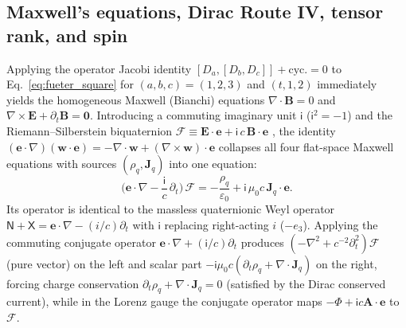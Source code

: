 \documentclass[aps,prd,onecolumn,tightenlines,nofootinbib,notitlepage,10pt,floatfix]{revtex4-2}
\theoremstyle{indentedtheorem}
\begin{document}
\subsection{Maxwell's equations, Dirac Route IV, tensor rank, and spin}
\label{sec:maxwell}

Applying the operator Jacobi identity $[D_a,[D_b,D_c]]+\text{cyc.}=0$ to Eq.~\eqref{eq:fueter_square} for $(a,b,c)=(1,2,3)$ and $(t,1,2)$ immediately yields the homogeneous Maxwell (Bianchi) equations $\nabla\cdot\mathbf{B}=0$ and $\nabla\times\mathbf{E}+\partial_t\mathbf{B}=\mathbf{0}$. Introducing a commuting imaginary unit $\mathsf{i}$ ($\mathsf{i}^2=-1$) and the Riemann--Silberstein biquaternion $\mathcal{F}\equiv\mathbf{E}\cdot\mathbf{e}+\mathsf{i}\,c\,\mathbf{B}\cdot\mathbf{e}$ \citep{Silberstein1907Elektromagnetische,Silberstein1912Quaternionic,BialynickiBirula1996Photon}, the identity $(\mathbf{e}\cdot\nabla)(\mathbf{w}\cdot\mathbf{e})=-\nabla\cdot\mathbf{w}+(\nabla\times\mathbf{w})\cdot\mathbf{e}$ collapses all four flat-space Maxwell equations with sources $(\rho_q,\mathbf{J}_q)$ into one equation:
\begin{equation}
    \Big(\mathbf{e}\cdot\nabla-\frac{\mathsf{i}}{c}\,\partial_t\Big)\,\mathcal{F} = -\frac{\rho_q}{\varepsilon_0} + \mathsf{i}\,\mu_0 c\,\mathbf{J}_q\cdot\mathbf{e} .
    \label{eq:maxwell_biquaternion}
\end{equation}
Its operator is identical to the massless quaternionic Weyl operator $\mathsf{N}+\mathsf{X}=\mathbf{e}\cdot\nabla-(i/c)\partial_t$ with $\mathsf{i}$ replacing right-acting $i$ ($-e_3$). Applying the commuting conjugate operator $\mathbf{e}\cdot\nabla+(\mathsf{i}/c)\partial_t$ produces $(-\nabla^2+c^{-2}\partial_t^2)\mathcal{F}$ (pure vector) on the left and scalar part $-\mathsf{i}\mu_0 c(\partial_t\rho_q+\nabla\cdot\mathbf{J}_q)$ on the right, forcing charge conservation $\partial_t\rho_q+\nabla\cdot\mathbf{J}_q=0$ (satisfied by the Dirac conserved current), while in the Lorenz gauge the conjugate operator maps $-\Phi+\mathsf{i}c\mathbf{A}\cdot\mathbf{e}$ to $\mathcal{F}$.
\end{document}
